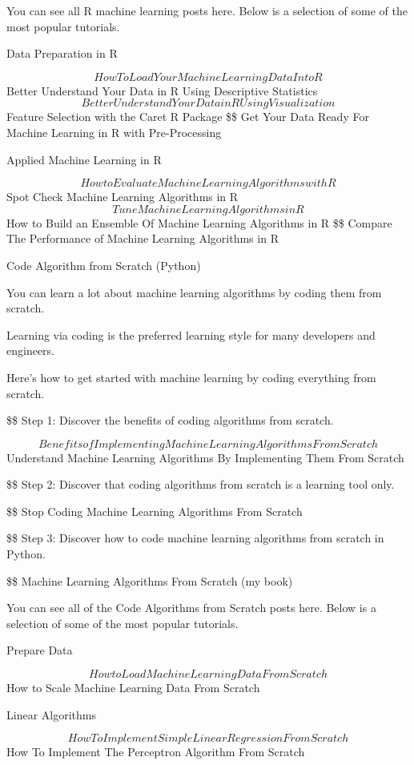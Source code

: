 \documentclass[11pt]{article}
\begin{document}
You can see all R machine learning posts here. Below is a selection of some of the most popular tutorials.

Data Preparation in R

$$ How To Load Your Machine Learning Data Into R
$$ Better Understand Your Data in R Using Descriptive Statistics
$$ Better Understand Your Data in R Using Visualization
$$ Feature Selection with the Caret R Package
\$\$ Get Your Data Ready For Machine Learning in R with Pre-Processing

Applied Machine Learning in R

$$ How to Evaluate Machine Learning Algorithms with R
$$ Spot Check Machine Learning Algorithms in R
$$ Tune Machine Learning Algorithms in R
$$ How to Build an Ensemble Of Machine Learning Algorithms in R
\$\$ Compare The Performance of Machine Learning Algorithms in R

Code Algorithm from Scratch (Python)

You can learn a lot about machine learning algorithms by coding them from scratch.

Learning via coding is the preferred learning style for many developers and engineers.

Here’s how to get started with machine learning by coding everything from scratch.

\$\$ Step 1: Discover the benefits of coding algorithms from scratch. 

$$ Benefits of Implementing Machine Learning Algorithms From Scratch
 $$ Understand Machine Learning Algorithms By Implementing Them From Scratch

\$\$ Step 2: Discover that coding algorithms from scratch is a learning tool only. 

\$\$ Stop Coding Machine Learning Algorithms From Scratch

\$\$ Step 3: Discover how to code machine learning algorithms from scratch in Python. 

\$\$ Machine Learning Algorithms From Scratch (my book)

You can see all of the Code Algorithms from Scratch posts here. Below is a selection of some of the most popular tutorials.

Prepare Data

$$ How to Load Machine Learning Data From Scratch
$$ How to Scale Machine Learning Data From Scratch

Linear Algorithms

$$ How To Implement Simple Linear Regression From Scratch
$$ How To Implement The Perceptron Algorithm From Scratch
\end{document}
